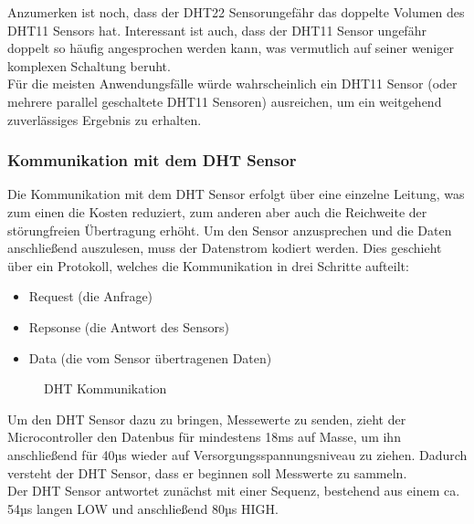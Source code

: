 Anzumerken ist noch, dass der DHT22 Sensorungefähr das doppelte Volumen des DHT11 Sensors hat. Interessant ist auch, dass der DHT11 Sensor ungefähr doppelt so häufig angesprochen werden kann, was vermutlich auf seiner weniger komplexen Schaltung beruht.\\
Für die meisten Anwendungsfälle würde wahrscheinlich ein DHT11 Sensor (oder mehrere parallel geschaltete DHT11 Sensoren) ausreichen, um ein weitgehend zuverlässiges Ergebnis zu erhalten.

\subsubsection{Kommunikation mit dem DHT Sensor\cite{dht}} 

Die Kommunikation mit dem DHT Sensor erfolgt über eine einzelne Leitung, was zum einen die Kosten reduziert, zum anderen aber auch die Reichweite der störungfreien Übertragung erhöht. Um den Sensor anzusprechen und die Daten anschließend auszulesen, muss der Datenstrom kodiert werden. Dies geschieht über ein Protokoll, welches die Kommunikation in drei Schritte aufteilt:
\begin{itemize} 
	\item Request (die Anfrage)
	\item Repsonse (die Antwort des Sensors)
	\item Data (die vom Sensor übertragenen Daten)
\end{itemize}


\begin{center}
	\begin{figure}[h]
	 
	 \noindent{}
	 \caption[DHT Kommunikation]{DHT Kommunikation}
	 \label{fig:dhtkommunikation}
	\end{figure}
\end{center}


Um den DHT Sensor dazu zu bringen, Messewerte zu senden, zieht der Microcontroller den Datenbus für mindestens 18ms auf Masse, um ihn anschließend für 40µs wieder auf Versorgungsspannungsniveau zu ziehen. Dadurch versteht der DHT Sensor, dass er beginnen soll Messwerte zu sammeln.\\
Der DHT Sensor antwortet zunächst mit einer Sequenz, bestehend aus einem ca. 54µs langen LOW und anschließend 80µs HIGH. 

